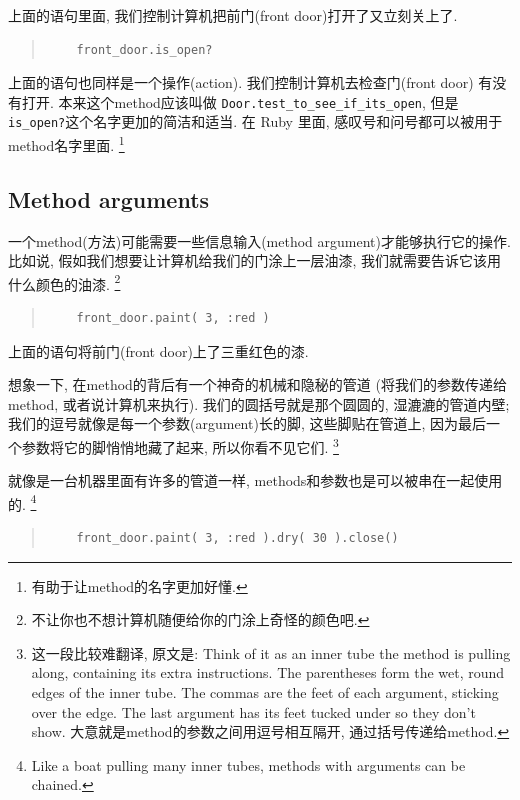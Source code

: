上面的语句里面, 我们控制计算机把前门(front door)打开了又立刻关上了. 

\begin{quotation}
  \begin{verbatim}
    front_door.is_open?
  \end{verbatim}
\end{quotation}

上面的语句也同样是一个操作(action). 我们控制计算机去检查门(front door)
有没有打开. 本来这个method应该叫做
\texttt{Door.test_to_see_if_its_open}, 
但是\texttt{is_open?}这个名字更加的简洁和适当. 
在 Ruby 里面, 感叹号和问号都可以被用于method名字里面. 
\footnote{有助于让method的名字更加好懂. }

\subsection*{Method arguments}
一个method(方法)可能需要一些信息输入(method argument)才能够执行它的操作. 
比如说, 假如我们想要让计算机给我们的门涂上一层油漆, 
我们就需要告诉它该用什么颜色的油漆. 
\footnote{不让你也不想计算机随便给你的门涂上奇怪的颜色吧. }

\begin{quotation}
  \begin{verbatim}
    front_door.paint( 3, :red )
  \end{verbatim}
\end{quotation}

上面的语句将前门(front door)上了三重红色的漆. 

想象一下, 在method的背后有一个神奇的机械和隐秘的管道
(将我们的参数传递给method, 或者说计算机来执行). 
我们的圆括号就是那个圆圆的, 湿漉漉的管道内壁; 
我们的逗号就像是每一个参数(argument)长的脚, 这些脚贴在管道上, 
因为最后一个参数将它的脚悄悄地藏了起来, 所以你看不见它们. 
\footnote{这一段比较难翻译, 原文是: Think of it as an inner tube the method is pulling along, containing its extra instructions. The parentheses form the wet, round edges of the inner tube. The commas are the feet of each argument, sticking over the edge. The last argument has its feet tucked under so they don't show. 大意就是method的参数之间用逗号相互隔开, 通过括号传递给method. }

就像是一台机器里面有许多的管道一样, methods和参数也是可以被串在一起使用的. \footnote{Like a boat pulling many inner tubes, methods with arguments can be chained.}

\begin{quotation}
  \begin{verbatim}
    front_door.paint( 3, :red ).dry( 30 ).close()
  \end{verbatim}
\end{quotation}


